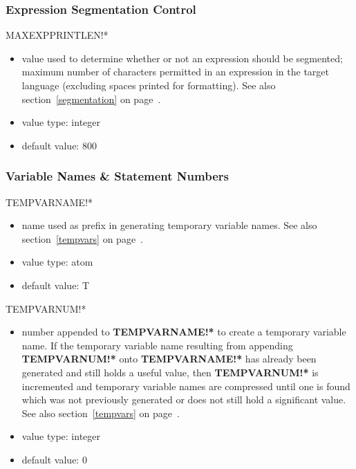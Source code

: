 \subsubsection{Expression Segmentation Control}
\begin{describe}{MAXEXPPRINTLEN!*}
\begin{itemize}
\item value used to determine whether or not an expression should be
segmented; maximum number of characters permitted in an expression
in the target language (excluding spaces printed for formatting).
See also section~\ref{segmentation} on page~\pageref{segmentation}.
\item value type:  integer
\item default value:  800
\end{itemize}
\end{describe} 

\subsubsection{Variable Names \& Statement Numbers}
\begin{describe}{TEMPVARNAME!*}
\begin{itemize}
\item name used as prefix in generating temporary variable names.
See also section~\ref{tempvars} on page~\pageref{tempvars}.
\item value type:  atom
\item default value:  T
\end{itemize}
\end{describe}

\begin{describe}{TEMPVARNUM!*}
\begin{itemize}
\item number appended to {\bf TEMPVARNAME!*} to create a temporary variable
name. If the temporary variable name resulting from appending
{\bf TEMPVARNUM!*} onto {\bf TEMPVARNAME!*} has already been generated
and still holds a useful value, then {\bf TEMPVARNUM!*} is incremented
and temporary variable names are compressed until one is found which
was not previously generated or does not still hold a significant value.
See also section~\ref{tempvars} on page~\pageref{tempvars}.
\item value type:  integer
\item default value:  0
\end{itemize}
\end{describe}

